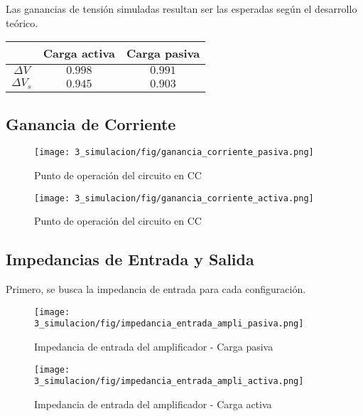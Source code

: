 Las ganancias de tensión simuladas resultan ser las esperadas según el desarrollo teórico.
\begin{table}[H]
    \centering
    \begin{tabular}{|c|c|c|}
    \hline
                        & Carga activa & Carga pasiva  \\ \hline
    $\Delta V$        & $0.998$   & $0.991$    \\ \hline
    $\Delta V_s$        & $0.945$   & $0.903$  \\ \hline
    \end{tabular}
    \end{table}


\subsection{Ganancia de Corriente}

\begin{figure}[H]
    \centering
    \texttt{[image: 3\_simulacion/fig/ganancia\_corriente\_pasiva.png]}
    \label{mediciones_pol_activa}
    \caption{Punto de operación del circuito en CC}
\end{figure}


\begin{figure}[H]
    \centering
    \texttt{[image: 3\_simulacion/fig/ganancia\_corriente\_activa.png]}
    \label{mediciones_pol_activa}
    \caption{Punto de operación del circuito en CC}
\end{figure}



\subsection{Impedancias de Entrada y Salida}
Primero, se busca la impedancia de entrada para cada configuración.

\begin{figure}[H]
    \centering
    \texttt{[image: 3\_simulacion/fig/impedancia\_entrada\_ampli\_pasiva.png]}
    \label{mediciones_pol_activa}
    \caption{Impedancia de entrada del amplificador - Carga pasiva}
\end{figure}

\begin{figure}[H]
    \centering
    \texttt{[image: 3\_simulacion/fig/impedancia\_entrada\_ampli\_activa.png]}
    \label{mediciones_pol_activa}
    \caption{Impedancia de entrada del amplificador - Carga activa}
\end{figure}

